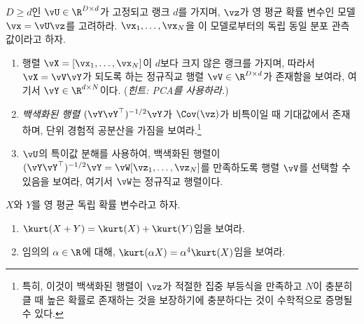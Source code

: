 \documentclass[../../book-main_ko.tex]{subfiles}
\begin{document}
\begin{exercise}\label{exercise:whitening}
    $D \geq d$인 $\vU \in \R^{D \times d}$가 고정되고 랭크 $d$를 가지며, $\vz$가 영 평균 확률 변수인 모델 $\vx = \vU \vz$를 고려하라. $\vx_1, \dots, \vx_N$을 이 모델로부터의 독립 동일 분포 관측값이라고 하자.
    \begin{enumerate}
        \item 행렬 $\vX = [\vx_1, \dots, \vx_N]$이 $d$보다 크지 않은 랭크를 가지며, 따라서 $\vX = \vV \vY$가 되도록 하는 정규직교 행렬 $\vV \in \R^{D \times d}$가 존재함을 보여라, 여기서 $\vY \in \R^{d \times N}$이다. (\textit{힌트: PCA를 사용하라.})
        \item \textit{백색화된 행렬} $(\vY \vY^\top)^{-1/2}\vY$가 $\Cov(\vz)$가 비특이일 때 기대값에서 존재하며, 단위 경험적 공분산을 가짐을 보여라.\footnote{특히, 이것이 백색화된 행렬이 $\vz$가 적절한 집중 부등식을 만족하고 $N$이 충분히 클 때 높은 확률로 존재하는 것을 보장하기에 충분하다는 것이 수학적으로 증명될 수 있다.}
        \item $\vU$의 특이값 분해를 사용하여, 백색화된 행렬이 $(\vY \vY^\top)^{-1/2} \vY = \vW [\vz_1, \dots, \vz_N]$를 만족하도록 행렬 $\vV$를 선택할 수 있음을 보여라, 여기서 $\vW$는 정규직교 행렬이다.
    \end{enumerate}
\end{exercise}

\begin{exercise}\label{exercise:kurtosis-linearity-properties}
    $X$와 $Y$를 영 평균 독립 확률 변수라고 하자.
    \begin{enumerate}
        \item $\kurt(X + Y) = \kurt(X) + \kurt(Y)$임을 보여라.
        \item 임의의 $\alpha \in \R$에 대해, $\kurt(\alpha X) = \alpha^4 \kurt(X)$임을 보여라.
    \end{enumerate}
\end{exercise}
\end{document}
